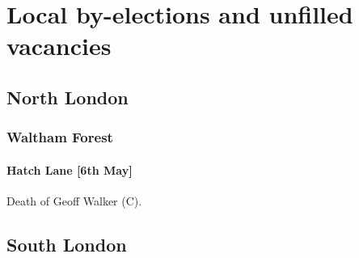 \documentclass[a4paper,openany]{book}
\begin{document}
\chapter{Local by-elections and unfilled vacancies}

\begin{resultsiii}

%
%
%
%
%

\section{North London}

\subsection*{Waltham Forest}

\subsubsection*{Hatch Lane \hspace*{\fill}\nolinebreak[1]%
	\enspace\hspace*{\fill}
	[6th May]}


Death of Geoff Walker (C).

\section{South London}


\end{resultsiii}
\end{document}
